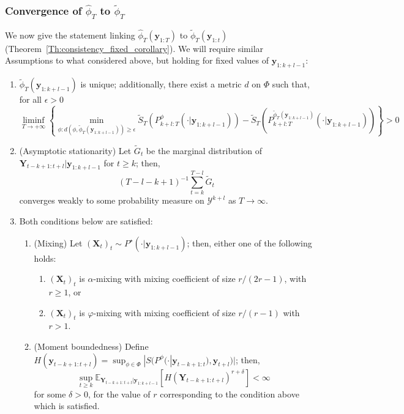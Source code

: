 \documentclass[twoside,11pt]{article}
\newcommand{\E}{\mathbb{E}}
\newcommand{\ddobs}{\mathbf{y}}
\newcommand{\Ddsim}{\mathbf{X}}
\newcommand{\Ddobs}{\mathbf{Y}}
\newcommand{\ddobsupt}{\mathbf{y}_{1:t}}
\newcommand{\ddobsupkplusl}{\mathbf{y}_{1:k+l-1}}
\newcommand{\ddobsupT}{\mathbf{y}_{1:T}}
\begin{document}
	
	
	\subsubsection{Convergence of $ \hat \phi_T $ to $ \tilde \phi_T $}\label{app:consistency_statement_part_2}
	We now give the statement linking $ 	\hat \phi_T(\ddobsupT) $ to $ \tilde\phi_T(\ddobsupt) $ (Theorem~\ref{Th:consistency_fixed_corollary}). We will require similar Assumptions to what considered above, but holding for fixed values of $ \ddobs_{1:k+l-1} $:
	\begin{enumerate}[label=\textbf{B\arabic*}]
		\item \label{ass:C2} $ 	\tilde\phi_T(\ddobsupkplusl) $ is unique; additionally, there exist a metric $ d $ on $ \Phi $ such that, for all $ \epsilon>0 $
		\begin{equation}\label{}
		\liminf_{T\to+\infty} \left\{ \min_{\phi: d(\phi, {	\tilde\phi_T(\ddobsupkplusl)})\ge\epsilon} \tilde S_T(P^\phi_{k+l:T}(\cdot|\ddobs_{1:k+l-1})) - \tilde S_T(P^{\tilde\phi_T(\ddobsupkplusl)}_{k+l:T}(\cdot|\ddobs_{1:k+l-1}))    \right\} >0
		\end{equation}
		\item \label{ass:C3} (Asymptotic stationarity) Let $\tilde G_t $ be the marginal distribution of $ \Ddobs_{t-k+1:t+l}|\ddobsupkplusl $ for $ t\ge k $; then, $$ (T-l-k+1)^{-1} \sum_{t=k}^{T-l} \tilde G_t $$ converges weakly to some probability measure on $ \mathcal{Y}^{k+l} $ as $ T \to\infty$.
		\item \label{ass:C4} Both conditions below are satisfied:
		\begin{enumerate}
			\item (Mixing) Let $ (\Ddsim_t)_t \sim P^\star(\cdot|\ddobsupkplusl)$; then, either one of the following holds: 
			\begin{enumerate}
				\item $ (\Ddsim_t)_t $ is $ \alpha $-mixing with mixing coefficient of size $ r/(2r-1) $, with $ r \ge 1 $, or
				\item $ (\Ddsim_t)_t $ is $ \varphi $-mixing with mixing coefficient of size $ r/(r-1) $ with $ r > 1 $.
			\end{enumerate}
			\item (Moment boundedness) Define $ H(\ddobs_{t-k+1:t+l}) = \sup_{\phi \in \Phi } |S(P^\phi(\cdot|\ddobs_{t-k+1:t}), \ddobs_{t+l})| $; then, $$ \sup_{t\ge k} \E_{\Ddobs_{t-k+1:t+l}|\ddobsupkplusl}\left[H(\Ddobs_{t-k+1:t+l})^{r+\delta}\right] <\infty$$ for some $ \delta>0 $, for the value of $ r $ corresponding to the condition above which is satisfied.
		\end{enumerate}
	\end{enumerate}
	
\end{document}
